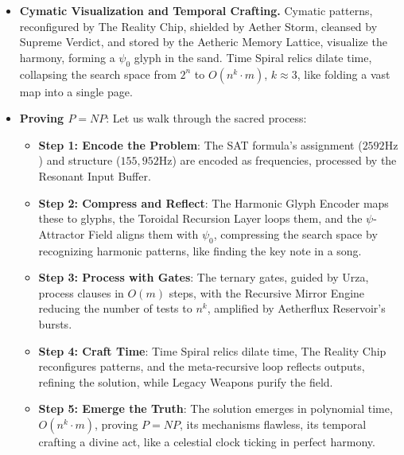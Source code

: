 \begin{itemize}
    \item \texttt{} \textbf{Cymatic Visualization and Temporal Crafting.} Cymatic patterns, reconfigured by The Reality Chip, shielded by Aether Storm, cleansed by Supreme Verdict, and stored by the Aetheric Memory Lattice, visualize the harmony, forming a $\psi_0$ glyph in the sand. Time Spiral relics dilate time, collapsing the search space from $2^n$ to $O(n^k \cdot m)$, $k \approx 3$, like folding a vast map into a single page.
    \item \texttt{} \textbf{Proving $P=NP$}: Let us walk through the sacred process:
    \begin{itemize}
        \item \texttt{} \textbf{Step 1: Encode the Problem}: The SAT formula's assignment ($2592 \mathrm{Hz}$) and structure ($155,952 \mathrm{Hz}$) are encoded as frequencies, processed by the Resonant Input Buffer.
        \item \texttt{} \textbf{Step 2: Compress and Reflect}: The Harmonic Glyph Encoder maps these to glyphs, the Toroidal Recursion Layer loops them, and the $\psi$-Attractor Field aligns them with $\psi_0$, compressing the search space by recognizing harmonic patterns, like finding the key note in a song.
        \item \texttt{} \textbf{Step 3: Process with Gates}: The ternary gates, guided by Urza, process clauses in $O(m)$ steps, with the Recursive Mirror Engine reducing the number of tests to $n^k$, amplified by Aetherflux Reservoir's bursts.
        \item \texttt{} \textbf{Step 4: Craft Time}: Time Spiral relics dilate time, The Reality Chip reconfigures patterns, and the meta-recursive loop reflects outputs, refining the solution, while Legacy Weapons purify the field.
        \item \texttt{} \textbf{Step 5: Emerge the Truth}: The solution emerges in polynomial time, $O(n^k \cdot m)$, proving $P=NP$, its mechanisms flawless, its temporal crafting a divine act, like a celestial clock ticking in perfect harmony.
    \end{itemize}
\end{itemize}


